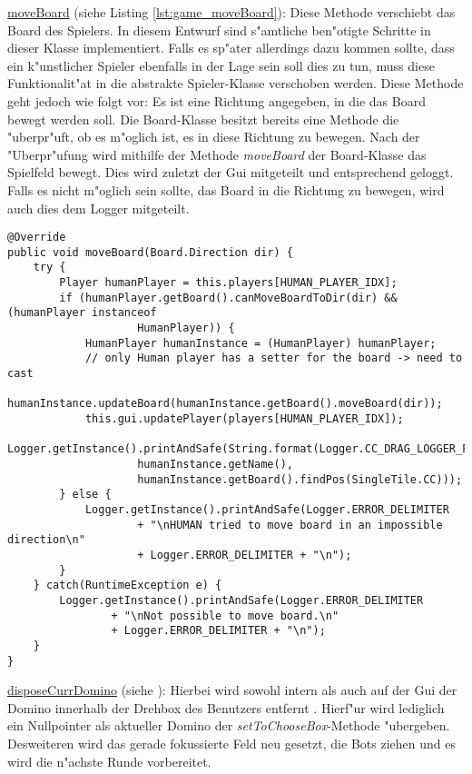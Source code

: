 \underline{moveBoard} (siehe Listing \ref{lst:game_moveBoard}): Diese Methode verschiebt das Board des Spielers. In diesem Entwurf sind s"amtliche ben"otigte Schritte in dieser Klasse implementiert. Falls es sp"ater allerdings dazu kommen sollte, dass ein k"unstlicher Spieler ebenfalls in der Lage sein soll dies zu tun, muss diese Funktionalit"at in die abstrakte Spieler-Klasse verschoben werden. Diese Methode geht jedoch wie folgt vor: Es ist eine Richtung angegeben, in die das Board bewegt werden soll. Die Board-Klasse besitzt bereits eine Methode die "uberpr"uft, ob es m"oglich ist, es in diese Richtung zu bewegen. Nach der "Uberpr"ufung wird mithilfe der Methode \emph{moveBoard} der Board-Klasse das Spielfeld bewegt. Dies wird zuletzt der Gui mitgeteilt und entsprechend geloggt. Falls es nicht m"oglich sein sollte, das Board in die Richtung zu bewegen, wird auch dies dem Logger mitgeteilt. 

\begin{lstlisting}[float,style=CodeHighlighting,caption=Game - moveBoard,label=lst:game_moveBoard]
@Override
public void moveBoard(Board.Direction dir) {
    try {
        Player humanPlayer = this.players[HUMAN_PLAYER_IDX];
        if (humanPlayer.getBoard().canMoveBoardToDir(dir) && (humanPlayer instanceof 
        			HumanPlayer)) {
            HumanPlayer humanInstance = (HumanPlayer) humanPlayer; 
            // only Human player has a setter for the board -> need to cast
            humanInstance.updateBoard(humanInstance.getBoard().moveBoard(dir));
            this.gui.updatePlayer(players[HUMAN_PLAYER_IDX]);
            Logger.getInstance().printAndSafe(String.format(Logger.CC_DRAG_LOGGER_FORMAT,
                    humanInstance.getName(), 
                    humanInstance.getBoard().findPos(SingleTile.CC)));
        } else {
            Logger.getInstance().printAndSafe(Logger.ERROR_DELIMITER
                    + "\nHUMAN tried to move board in an impossible direction\n" 
                    + Logger.ERROR_DELIMITER + "\n");
        }
    } catch(RuntimeException e) {
        Logger.getInstance().printAndSafe(Logger.ERROR_DELIMITER 
        		+ "\nNot possible to move board.\n"
                + Logger.ERROR_DELIMITER + "\n");
    }
}
\end{lstlisting}

\underline{disposeCurrDomino} (siehe ): Hierbei wird sowohl intern als auch auf der Gui der Domino innerhalb der Drehbox des Benutzers entfernt . Hierf"ur wird lediglich ein Nullpointer als aktueller Domino der \emph{setToChooseBox}-Methode "ubergeben. Desweiteren wird das gerade fokussierte Feld neu gesetzt, die Bots ziehen und es wird die n"achste Runde vorbereitet. 


